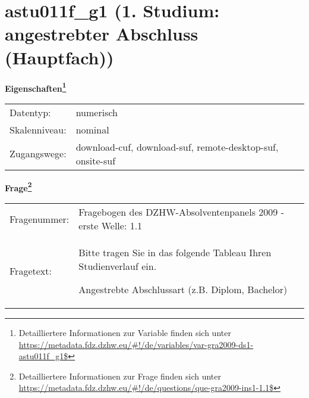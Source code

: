 
    \setcounter{footnote}{0}

    \vspace*{-1.8cm}
	\section{astu011f\_g1 (1. Studium: angestrebter Abschluss (Hauptfach))}
	\label{section:astu011f_g1}



    \vspace*{0.5cm}
    \noindent\textbf{Eigenschaften\footnote{Detailliertere Informationen zur Variable finden sich unter
		\url{https://metadata.fdz.dzhw.eu/\#!/de/variables/var-gra2009-ds1-astu011f_g1$}}}\\
	\begin{tabularx}{\hsize}{@{}lX}
	Datentyp: & numerisch \\
	Skalenniveau: & nominal \\
	Zugangswege: &
	  download-cuf, 
	  download-suf, 
	  remote-desktop-suf, 
	  onsite-suf
 \\
    \end{tabularx}



				\vspace*{0.5cm}
                \noindent\textbf{Frage\footnote{Detailliertere Informationen zur Frage finden sich unter
		              \url{https://metadata.fdz.dzhw.eu/\#!/de/questions/que-gra2009-ins1-1.1$}}}\\
				\begin{tabularx}{\hsize}{@{}lX}
					Fragenummer: &
					  Fragebogen des DZHW-Absolventenpanels 2009 - erste Welle:
					  1.1
 \\
					Fragetext: & Bitte tragen Sie in das folgende Tableau Ihren Studienverlauf ein.\par  Angestrebte Abschlussart (z.B. Diplom, Bachelor) \\
				\end{tabularx}





